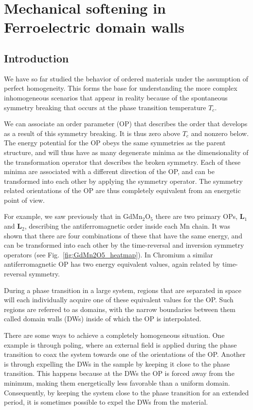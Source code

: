 \chapter{Mechanical softening in Ferroelectric domain walls \label{ch:Softening}}


\section{Introduction}
We have so far studied the behavior of ordered materials under the assumption of perfect homogeneity.
This forms the base for understanding the more complex inhomogeneous scenarios that appear in reality because of the spontaneous symmetry breaking that occurs at the phase transition temperature $T_c$.

We can associate an order parameter (OP) that describes the order that develops as a result of this symmetry breaking. It is thus zero above $T_c$ and nonzero below.
The energy potential for the OP obeys the same symmetries as the parent structure, and will thus have as many degenerate minima as the dimensionality of the transformation operator that describes the broken symmetry.
Each of these minima are associated with a different direction of the OP, and can be transformed into each other by applying the symmetry operator. 
The symmetry related orientations of the OP are thus completely equivalent from an energetic point of view.

For example, we saw previously that in GdMn$_2$O$_5$ there are two primary OPs, $\bm{L}_1$ and $\bm{L}_2$, describing the antiferromagnetic order inside each Mn chain.
It was shown that there are four combinations of these that have the same energy, and can be transformed into each other by the time-reversal and inversion symmetry operators (see Fig.~\ref{fig:GdMn2O5_heatmap}). 
In Chromium a similar antiferromagnetic OP has two energy equivalent values, again related by time-reversal symmetry.

During a phase transition in a large system, regions that are separated in space will each individually acquire one of these equivalent values for the OP.
Such regions are referred to as domains, with the narrow boundaries between them called domain walls (DWs) inside of which the OP is interpolated.

There are some ways to achieve a completely homogeneous situation. One example is through poling, where an external field is applied during the phase transition to coax the system towards one of the orientations of the OP.
Another is through expelling the DWs in the sample by keeping it close to the phase transition.
This happens because at the DWs the OP is forced away from the minimum, making them energetically less favorable than a uniform domain.
Consequently, by keeping the system close to the phase transition for an extended period, it is sometimes possible to expel the DWs from the material.

